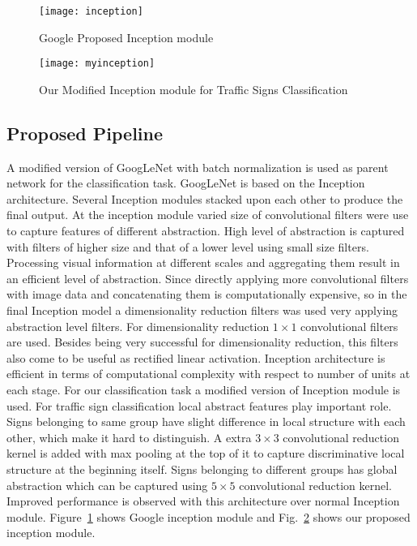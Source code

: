 \documentclass[conference]{IEEEtran}
\begin{document}
\begin{figure}
  \centering
      \texttt{[image: inception]}
\caption{Google Proposed Inception module}
\label{fig:gincept}
\end{figure}

\begin{figure}
  \centering
      \texttt{[image: myinception]}
\caption{Our Modified Inception module for Traffic Signs Classification}
\label{fig:myincept}
\end{figure}

\subsection{Proposed Pipeline}
A modified version of GoogLeNet \cite{googlenet} with batch normalization \cite{batch} is used as parent network for the classification task. GoogLeNet is based on the Inception architecture. Several Inception modules stacked upon each other to produce the final output. At the inception module varied size of convolutional filters were use to capture features of different abstraction. High level of abstraction is captured with filters of higher size and that of a lower level using small size filters. Processing
visual information at different scales and aggregating them result in an efficient level of abstraction. Since directly applying more
convolutional filters with image data and concatenating them is computationally expensive, so in the final Inception model a dimensionality reduction filters was used very applying abstraction level filters. For dimensionality reduction $ 1 \times 1 $ convolutional filters are used. Besides being very successful for dimensionality reduction, this filters also come to be useful as rectified linear activation. Inception architecture is efficient in terms of computational complexity with respect to number of units at each stage. 
 For our classification task a modified version of Inception module is used. For traffic sign classification local abstract features play important role. Signs belonging to same group have slight difference in local structure with each other, which make it hard to distinguish. A extra $ 3 \times 3 $ convolutional reduction kernel is added with max pooling at the top of it to capture discriminative local structure at the beginning itself. Signs belonging to different groups has global abstraction which can be captured using $ 5 \times 5 $ convolutional reduction kernel. Improved performance is observed with this architecture over normal Inception module. Figure~\ref{fig:gincept} shows Google inception module and Fig.~\ref{fig:myincept} shows our proposed inception module.
\end{document}
